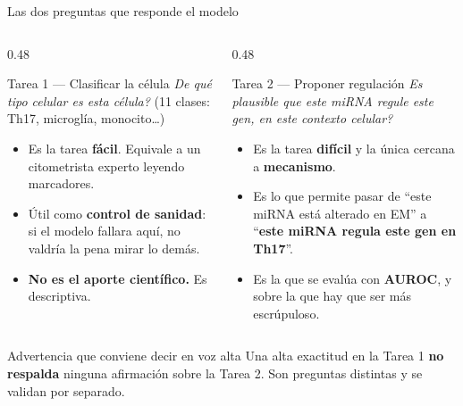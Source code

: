 
\begin{frame}{Las dos preguntas que responde el modelo}
  \begin{columns}[T]
    \begin{column}{0.48\textwidth}
      \begin{block}{Tarea 1 --- Clasificar la c\'elula}
        \small
        \emph{\textquestiondown{}De qu\'e tipo celular es esta c\'elula?} (11 clases: Th17, microgl\'ia, monocito\ldots)
      \end{block}
      \small
      \begin{itemize}
        \item Es la tarea \textbf{f\'acil}. Equivale a un citometrista experto leyendo marcadores.
        \item \'Util como \textbf{control de sanidad}: si el modelo fallara aqu\'i, no valdr\'ia la pena mirar lo dem\'as.
        \item \textbf{No es el aporte cient\'ifico.} Es descriptiva.
      \end{itemize}
    \end{column}
    \begin{column}{0.48\textwidth}
      \begin{block}{Tarea 2 --- Proponer regulaci\'on}
        \small
        \emph{\textquestiondown{}Es plausible que este miRNA regule este gen, en este contexto celular?}
      \end{block}
      \small
      \begin{itemize}
        \item Es la tarea \textbf{dif\'icil} y la \'unica cercana a \textbf{mecanismo}.
        \item Es lo que permite pasar de ``este miRNA est\'a alterado en EM'' a ``\textbf{este miRNA regula este gen en Th17}''.
        \item Es la que se eval\'ua con \textbf{AUROC}, y sobre la que hay que ser m\'as escr\'upuloso.
      \end{itemize}
    \end{column}
  \end{columns}

  \vspace{0.5em}
  \begin{block}{Advertencia que conviene decir en voz alta}
    \small
    Una alta exactitud en la Tarea 1 \textbf{no respalda} ninguna afirmaci\'on sobre la Tarea 2. Son preguntas distintas y se validan por separado.
  \end{block}
\end{frame}

